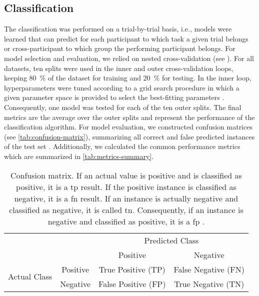 \subsection{Classification}
The classification was performed on a trial-by-trial basis, i.e., models were learned that can predict for each participant to which task a given trial belongs or cross-participant to which group the performing participant belongs. For model selection and evaluation, we relied on nested cross-validation (see ). For all datasets, ten splits were used in the inner and outer cross-validation loops, keeping 80~\% of the dataset for training and 20~\% for testing. In the inner loop, hyperparameters were tuned according to a grid search procedure in which a given parameter space is provided to select the best-fitting parameters \cite{Varoquaux2017}. Consequently, one model was tested for each of the ten outer splits. The final metrics are the average over the outer splits and represent the performance of the classification algorithm. For model evaluation, we constructed confusion matrices (see \autoref{tab:confusion-matrix}), summarizing all correct and false predicted instances of the test set \cite{Fawcett2006}. Additionally, we calculated the common performance metrics which are summarized in \autoref{tab:metrics-summary}.

\begin{table}[ht]
    \captionsetup{justification=raggedright,singlelinecheck=false}
    \caption[Confusion matrix]{Confusion matrix. If an actual value is positive and is classified as positive, it is a \gls{tp} result. If the positive instance is classified as negative, it is a \gls{fn} result. If an instance is actually negative and classified as negative, it is called \gls{tn}. Consequently, if an instance is negative and classified as positive, it is a \gls{fp} \cite{Fawcett2006}.}
    \label{tab:confusion-matrix}
    \renewcommand{\arraystretch}{1.25}
    \centering
        \begin{tabular}{cc|c|c|}
            \cline{3-4}
            & & \multicolumn{2}{c|}{Predicted Class} \\ \cline{3-4} 
            & & Positive & Negative \\ \hline
            \multicolumn{1}{|c|}{\multirow{2}{*}{Actual Class}} & Positive & True Positive (TP) & False Negative (FN) \\ \cline{2-4} 
            \multicolumn{1}{|c|}{} & Negative & False Positive (FP) & True Negative (TN) \\ \hline
        \end{tabular}
\end{table}

